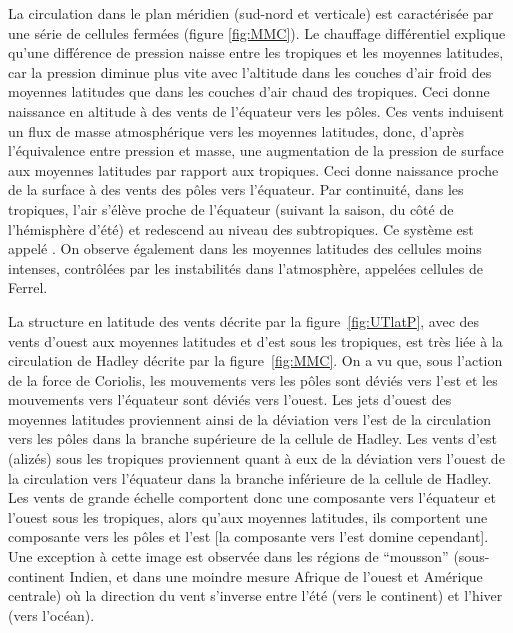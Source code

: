 \sk
La circulation dans le plan méridien (sud-nord et verticale) est caractérisée par une série de cellules fermées (figure \ref{fig:MMC}). Le chauffage différentiel explique qu'une différence de pression naisse entre les tropiques et les moyennes latitudes, car la pression diminue plus vite avec l'altitude dans les couches d'air froid des moyennes latitudes que dans les couches d'air chaud des tropiques. Ceci donne naissance en altitude à des vents de l'équateur vers les pôles. Ces vents induisent un flux de masse atmosphérique vers les moyennes latitudes, donc, d'après l'équivalence entre pression et masse, une augmentation de la pression de surface aux moyennes latitudes par rapport aux tropiques. Ceci donne naissance proche de la surface à des vents des pôles vers l'équateur. Par continuité, dans les tropiques, l'air s'élève proche de l'équateur (suivant la saison, du côté de l'hémisphère d'été) et redescend au niveau des subtropiques. Ce système est appelé . On observe également dans les moyennes latitudes des cellules moins intenses, contrôlées par les instabilités dans l'atmosphère, appelées cellules de Ferrel. 


\sk
La structure en latitude des vents décrite par la figure~\ref{fig:UTlatP}, avec des vents d'ouest aux moyennes latitudes et d'est sous les tropiques, est très liée à la circulation de Hadley décrite par la figure~\ref{fig:MMC}. On a vu que, sous l'action de la force de Coriolis, les mouvements vers les pôles sont déviés vers l'est et les mouvements vers l'équateur sont déviés vers l'ouest. Les jets d'ouest des moyennes latitudes proviennent ainsi de la déviation vers l'est de la circulation vers les pôles dans la branche supérieure de la cellule de Hadley. Les vents d'est (alizés) sous les tropiques proviennent quant à eux de la déviation vers l'ouest de la circulation vers l'équateur dans la branche inférieure de la cellule de Hadley. Les vents de grande échelle comportent donc une composante vers l'équateur et l'ouest sous les tropiques, alors qu'aux moyennes latitudes, ils comportent une composante vers les pôles et l'est [la composante vers l'est domine cependant]. Une exception à cette image est observée dans les régions de ``mousson'' (sous-continent Indien, et dans une moindre mesure Afrique de l'ouest et Amérique centrale) où la direction du vent s'inverse entre l'été (vers le continent) et l'hiver (vers l'océan).

